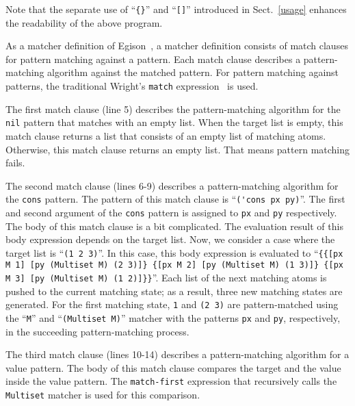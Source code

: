 \documentclass[acmlarge]{acmart}
\newcommand{\new}[1]{\textcolor{blue}{#1}}
\begin{document}
\noindent
Note that the separate use of ``\texttt{\{\}}'' and ``\lstinline{[]}'' introduced in Sect.~\ref{usage} enhances the readability of the above program.

As a matcher definition of Egison~\cite{egi2018aplas}, a matcher definition consists of match clauses for pattern matching against a pattern.
Each match clause describes a pattern-matching algorithm against the matched pattern.
For pattern matching against patterns, the traditional Wright's \lstinline{match} expression~\cite{wright1993pattern} is used.

The first match clause (line 5) describes the pattern-matching algorithm for the \lstinline{nil} pattern that matches with an empty list.
When the target list is empty, this match clause returns a list that consists of an empty list of matching atoms.
Otherwise, this match clause returns an empty list.
That means pattern matching fails.

The second match clause (lines 6-9) describes a pattern-matching algorithm for the \lstinline{cons} pattern.
The pattern of this match clause is  ``\lstinline{('cons px py)}''.
The first and second argument of the \lstinline{cons} pattern is assigned to \lstinline{px} and \lstinline{py} respectively.
The body of this match clause is a bit complicated.
The evaluation result of this body expression depends on the target list.
Now, we consider a case where the target list is ``\lstinline{(1 2 3)}''.
In this case, this body expression is evaluated to ``\texttt{\{\{[px M 1] [py (Multiset M) (2 3)]\} \{[px M 2] [py (Multiset M) (1 3)]\} \{[px M 3] [py (Multiset M) (1 2)]\}\}}''.
Each list of the next matching atoms is pushed to the current matching state; as a result, three new matching states are generated.
For the first matching state, \lstinline{1} and \lstinline{(2 3)} are pattern-matched using the ``\lstinline{M}'' and ``\lstinline{(Multiset M)}'' matcher with the patterns \lstinline{px} and \lstinline{py}, respectively, in the succeeding pattern-matching process.

The third match clause (lines 10-14) describes a pattern-matching algorithm for a value pattern.
The body of this match clause compares the target and the value inside the value pattern.
The \lstinline{match-first} expression that recursively calls the \lstinline{Multiset} matcher is used for this comparison.
\end{document}
